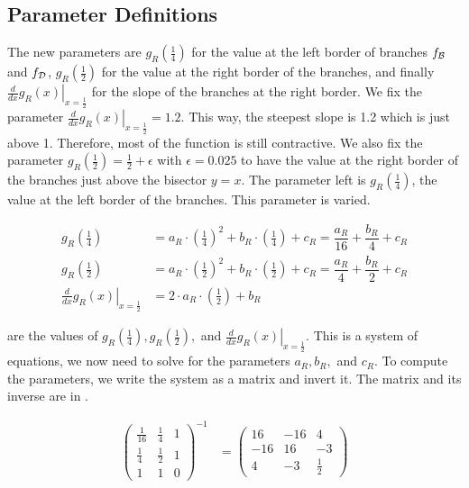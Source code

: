 \subsection{Parameter Definitions}
\label{sec:setup.quad.hyper.params}

The new parameters are $g_R\left(\frac{1}{4}\right)$ for the value at the left border of branches $f_{\mathcal{B}}$ and $f_{\mathcal{D}}$, $g_R\left(\frac{1}{2}\right)$ for the value at the right border of the branches, and finally $\left. \frac{d}{dx} g_R(x) \right|_{x = \frac{1}{2}}$ for the slope of the branches at the right border.
We fix the parameter $\left. \frac{d}{dx} g_R(x) \right|_{x = \frac{1}{2}} = 1.2$.
This way, the steepest slope is 1.2 which is just above 1.
Therefore, most of the function is still contractive.
We also fix the parameter $g_R\left(\frac{1}{2}\right) = \frac{1}{2} + \epsilon$ with $\epsilon = 0.025$ to have the value at the right border of the branches just above the bisector $y = x$.
The parameter left is $g_R\left(\frac{1}{4}\right)$, the value at the left border of the branches.
This parameter is varied.

\begin{subequations}
	\begin{align}
		g_R\left(\frac{1}{4}\right)                                     & = a_R \cdot \left(\frac{1}{4}\right)^2 + b_R \cdot \left(\frac{1}{4}\right) + c_R = \dfrac{a_R}{16} + \dfrac{b_R}{4} + c_R \label{equ:setup.quad.hyper.A} \\
		g_R\left(\frac{1}{2}\right)                                     & = a_R \cdot \left(\frac{1}{2}\right)^2 + b_R \cdot \left(\frac{1}{2}\right) + c_R = \dfrac{a_R}{4} + \dfrac{b_R}{2} + c_R \label{equ:setup.quad.hyper.B}  \\
		\left. \frac{d}{dx} g_R\left(x\right) \right|_{x = \frac{1}{2}} & = 2 \cdot a_R \cdot \left(\frac{1}{2}\right) + b_R \label{equ:setup.quad.hyper.C}
	\end{align}
\end{subequations}

 are the values of $g_R\left(\frac{1}{4}\right), g_R\left(\frac{1}{2}\right),$ and $\left. \frac{d}{dx} g_R\left(x\right) \right|_{x = \frac{1}{2}}$.
This is a system of equations, we now need to solve for the parameters $a_R, b_R,$ and $c_R$.
To compute the parameters, we write the system as a matrix and invert it.
The matrix and its inverse are in .

\begin{align}
	\begin{pmatrix}
		\frac{1}{16} & \frac{1}{4} & 1 \\
		\frac{1}{4}  & \frac{1}{2} & 1 \\
		1            & 1           & 0
	\end{pmatrix}^{-1} & =
	\begin{pmatrix}
		16  & -16 & 4           \\
		-16 & 16  & -3          \\
		4   & -3  & \frac{1}{2}
	\end{pmatrix}
	\label{equ:setup.quad.hyper.matrix}
\end{align}

